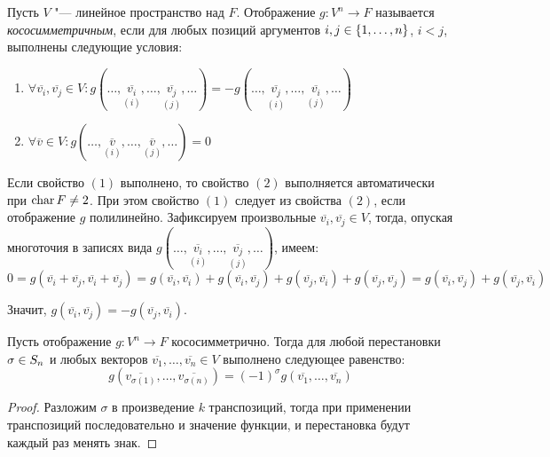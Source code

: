 \begin{definition}
	Пусть $V$ "--- линейное пространство над $F$. Отображение $g: V^n \rightarrow F$ называется \textit{кососимметричным}, если для любых позиций аргументов $i, j \in \{1, \dotsc, n\}$, $i < j$, выполнены следующие условия:
	\begin{enumerate}
		\item $\forall \overline{v_i}, \overline{v_j} \in V: g(\dots, \underset{(i)}{\overline{v_i}}, \dots, \underset{(j)}{\overline{v_j}}, \dots) = -g(\dots, \underset{(i)}{\overline{v_j}}, \dots, \underset{(j)}{\overline{v_i}}, \dots)$
		\item $\forall \overline{v} \in V: g(\dots, \underset{(i)}{\overline{v}}, \dots, \underset{(j)}{\overline{v}}, \dots) = 0$
	\end{enumerate}
\end{definition}

\begin{note}
	Если свойство $(1)$ выполнено, то свойство $(2)$ выполняется автоматически при $\operatorname{char}{F} \ne 2$. При этом свойство $(1)$ следует из свойства $(2)$, если отображение $g$ полилинейно. Зафиксируем произвольные $\overline{v_i}, \overline{v_j} \in V$, тогда, опуская многоточия в записях вида $g(\dots, \underset{(i)}{\overline{v_i}}, \dots, \underset{(j)}{\overline{v_j}}, \dots)$, имеем:
	\[0 = g(\overline{v_i} + \overline{v_j}, \overline{v_i} + \overline{v_j}) = g(\overline{v_i}, \overline{v_i}) + g(\overline{v_i}, \overline{v_j}) + g(\overline{v_j}, \overline{v_i}) + g(\overline{v_j}, \overline{v_j}) = g(\overline{v_i}, \overline{v_j}) + g(\overline{v_j}, \overline{v_i})\]
	
	Значит, $g(\overline{v_i}, \overline{v_j}) = -g(\overline{v_j}, \overline{v_i})$.
\end{note}

\begin{proposition}
	Пусть отображение $g : V^n \rightarrow F$ кососимметрично. Тогда для любой перестановки $\sigma \hm{\in} S_n$ и любых векторов $\overline{v_1}, \dotsc, \overline{v_n} \in V$ выполнено следующее равенство:
	\[g(\overline{v_{\sigma(1)}}, \dots, \overline{v_{\sigma(n)}}) = (-1)^\sigma g(\overline{v_1}, \dots, \overline{v_n})\]
\end{proposition}

\begin{proof}
	Разложим $\sigma$ в произведение $k$ транспозиций, тогда при применении транспозиций последовательно и значение функции, и перестановка будут каждый раз менять знак.
\end{proof}

